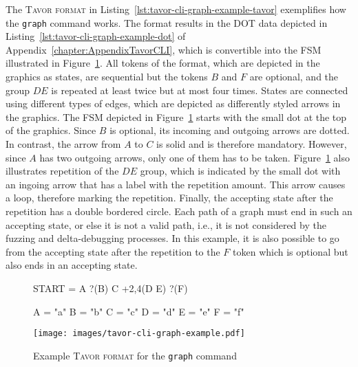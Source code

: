 The \textsc{Tavor format} in Listing~\ref{lst:tavor-cli-graph-example-tavor} exemplifies how the \texttt{graph} command works. The format results in the DOT data depicted in Listing~\ref{lst:tavor-cli-graph-example-dot} of Appendix~\ref{chapter:AppendixTavorCLI}, which is convertible into the FSM illustrated in Figure~\ref{fig:tavor-cli-graph-example-svg}. All tokens of the format, which are depicted in the graphics as states, are sequential but the tokens $B$ and $F$ are optional, and the group $D E$ is repeated at least twice but at most four times. States are connected using different types of edges, which are depicted as differently styled arrows in the graphics. The FSM depicted in Figure~\ref{fig:tavor-cli-graph-example-svg} starts with the small dot at the top of the graphics. Since $B$ is optional, its incoming and outgoing arrows are dotted. In contrast, the arrow from $A$ to $C$ is solid and is therefore mandatory. However, since $A$ has two outgoing arrows, only one of them has to be taken. Figure~\ref{fig:tavor-cli-graph-example-svg} also illustrates repetition of the $D E$ group, which is indicated by the small dot with an ingoing arrow that has a label with the repetition amount. This arrow causes a loop, therefore marking the repetition. Finally, the accepting state after the repetition has a double bordered circle. Each path of a graph must end in such an accepting state, or else it is not a valid path, i.e., it is not considered by the fuzzing and delta-debugging processes. In this example, it is also possible to go from the accepting state after the repetition to the $F$ token which is optional but also ends in an accepting state.

\begin{figure}[t]
\centering
\begin{minipage}{.5\textwidth}
  \centering
  \begin{listing}[H]
  \caption{Example \textsc{Tavor format} for the \texttt{graph} command}
  \label{lst:tavor-cli-graph-example-tavor}
  \begin{gocode}
  START = A ?(B) C +2,4(D E) ?(F)

  A = "a"
  B = "b"
  C = "c"
  D = "d"
  E = "e"
  F = "f"
  \end{gocode}
  \end{listing}
\end{minipage}%
\begin{minipage}{.5\textwidth}
  \centering
  \texttt{[image: images/tavor-cli-graph-example.pdf]}
  \label{fig:tavor-cli-graph-example-svg}
\end{minipage}
\end{figure}

